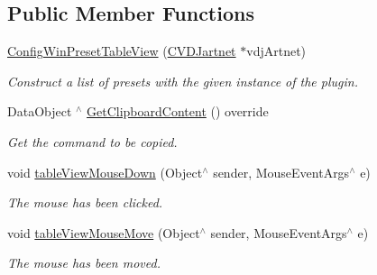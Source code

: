 \subsection*{Public Member Functions}
\begin{DoxyCompactItemize}
\item 
\mbox{\label{classConfigWinPresetTableView_a71eeee3a1ef00851c6594cee65c511b6}} 
\hyperlink{classConfigWinPresetTableView_a71eeee3a1ef00851c6594cee65c511b6}{Config\+Win\+Preset\+Table\+View} (\hyperlink{classCVDJartnet}{C\+V\+D\+Jartnet} $\ast$vdj\+Artnet)
\begin{DoxyCompactList}\small\item\em Construct a list of presets with the given instance of the plugin. \end{DoxyCompactList}\item 
\mbox{\label{classConfigWinPresetTableView_a04e633a3caed23df0e163ee2b149868f}} 
Data\+Object $^\wedge$ \hyperlink{classConfigWinPresetTableView_a04e633a3caed23df0e163ee2b149868f}{Get\+Clipboard\+Content} () override
\begin{DoxyCompactList}\small\item\em Get the command to be copied. \end{DoxyCompactList}\item 
\mbox{\label{classConfigWinPresetTableView_af04fd0fbb22bbdbb9a8069f7ecf619bb}} 
void \hyperlink{classConfigWinPresetTableView_af04fd0fbb22bbdbb9a8069f7ecf619bb}{table\+View\+Mouse\+Down} (Object$^\wedge$ sender, Mouse\+Event\+Args$^\wedge$ e)
\begin{DoxyCompactList}\small\item\em The mouse has been clicked. \end{DoxyCompactList}\item 
\mbox{\label{classConfigWinPresetTableView_a68628baf1374a039651efc67ae020ac4}} 
void \hyperlink{classConfigWinPresetTableView_a68628baf1374a039651efc67ae020ac4}{table\+View\+Mouse\+Move} (Object$^\wedge$ sender, Mouse\+Event\+Args$^\wedge$ e)
\begin{DoxyCompactList}\small\item\em The mouse has been moved. \end{DoxyCompactList}\end{DoxyCompactItemize}
